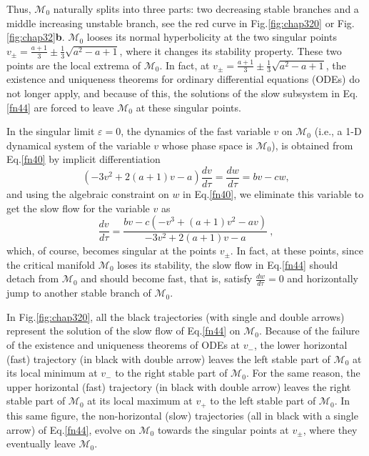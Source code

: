Thus, $\mathcal{M}_0$ naturally splits into three parts: 
two decreasing stable branches and a middle
increasing unstable branch, see the red curve in Fig.\ref{fig:chap320} or
Fig.\ref{fig:chap32}\textbf{b}.  $\mathcal{M}_0$ 
looses its normal hyperbolicity at
the two singular points $v_\pm= \frac{a+1}{3} \pm \frac{1}{3}\sqrt{a^2-a+1}$, where it 
changes its stability property. These two points
are the local extrema of $\mathcal{M}_0$.
In fact, at $v_\pm= \frac{a+1}{3} \pm \frac{1}{3}\sqrt{a^2-a+1}$,
the existence and uniqueness theorems for ordinary differential 
equations (ODEs) do not longer apply, and because of this, the solutions of the slow subsystem 
in Eq.\eqref{fn44} are forced to leave $\mathcal{M}_0$
at these singular points.

In the singular limit $\varepsilon=0$, the dynamics of the fast variable $v$ on $\mathcal{M}_0$ (i.e., 
a 1-D dynamical system of the variable $v$ whose phase space is $\mathcal{M}_0$), is obtained from Eq.\eqref{fn40}  
by implicit differentiation \begin{equation}\label{fn43} (-3v^2
+2(a+1)v-a)\frac{dv}{d\tau}=\frac{dw}{d\tau}=bv-cw, \end{equation} and using the algebraic constraint on $w$ in Eq.\eqref{fn40}, 
we eliminate this variable to get the slow flow for the variable $v$ as
\begin{equation}\label{fn44} \frac{dv}{d\tau}=\frac{bv -c (-v^3+(a+1)v^2-av)}{-3v^2
+2(a+1)v-a}\ , \end{equation} which, of course, becomes singular at the points $v_\pm$.
In fact, at these points, since the critical manifold $\mathcal{M}_0$ loses its 
stability, the slow flow in Eq.\eqref{fn44} should detach from $\mathcal{M}_0$ and
should become fast, that is, satisfy $\frac{dw}{d\tau}=0$ and horizontally
jump to another stable branch of $\mathcal{M}_0$. 

In Fig.\ref{fig:chap320}, all the black trajectories (with single and double arrows) represent the solution of the slow flow of 
Eq.\eqref{fn44} on $\mathcal{M}_0$. Because of the failure of the existence and uniqueness theorems of ODEs at $v_-$,
the lower horizontal (fast) trajectory (in black with double arrow) 
leaves the left stable part of $\mathcal{M}_0$ at its local minimum at $v_-$ to 
the right stable part of $\mathcal{M}_0$. For the same reason, the upper horizontal (fast) trajectory (in black with double arrow) 
leaves the right stable part of $\mathcal{M}_0$ at its local maximum at $v_+$ to the left stable part of $\mathcal{M}_0$.
In this same figure, the non-horizontal (slow) trajectories (all in black with a single arrow) of Eq.\eqref{fn44}, 
evolve on $\mathcal{M}_0$ towards the singular points at $v_\pm$, where they eventually leave $\mathcal{M}_0$. 
 
